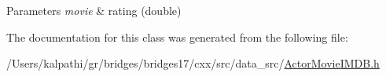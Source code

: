 \begin{DoxyParams}{Parameters}
{\em movie} & rating (double) \\
\hline
\end{DoxyParams}


The documentation for this class was generated from the following file\+:\begin{DoxyCompactItemize}
\item 
/\+Users/kalpathi/gr/bridges/bridges17/cxx/src/data\+\_\+src/\hyperlink{_actor_movie_i_m_d_b_8h}{Actor\+Movie\+I\+M\+D\+B.\+h}\end{DoxyCompactItemize}
